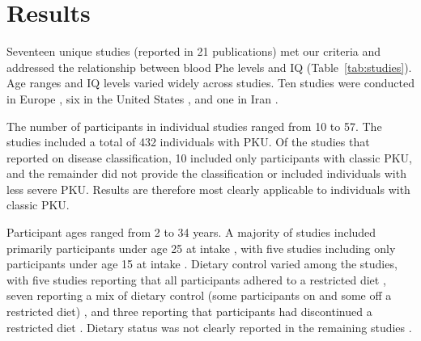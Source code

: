 \documentclass{svjour3}                     %
\begin{document}

\section{Results} %
\label{sec:Results}

Seventeen unique studies (reported in 21 publications) met our criteria and addressed the relationship between blood Phe levels and IQ (Table~\ref{tab:studies}). Age ranges and IQ levels varied widely across studies. Ten studies were conducted in Europe \citep{Cerone:1999vf, Griffiths:2000ti, Jones:1995vw, Leuzzi:1998um, Pfaendner:2005uo, Rupp:2001jg, Schmidt:1994wx, Weglage:2001us, Weglage:2000wf, Weglage:1999tr}, six in the United States \citep{Anastasoaie:2008hv, Ris:1997vv, Seashore:1985wf, Viau:2011he, WASSERSTEIN:2006bv, Welsh:1990uw}, and one in Iran \citep{Azadi:2009ha}.

The number of participants in individual studies ranged from 10 to 57. The studies included a total of 432 individuals with PKU. Of the studies that reported on disease classification, 10 included only participants with classic PKU, and the remainder did not provide the classification or included individuals with less severe PKU. Results are therefore most clearly applicable to individuals with classic PKU.

Participant ages ranged from 2 to 34 years. A majority of studies included primarily participants under age 25 at intake \citep{Anastasoaie:2008hv, Azadi:2009ha, Cerone:1999vf, Griffiths:2000ti, Leuzzi:1998um, Ris:1997vv, Schmidt:1994wx, Seashore:1985wf, Weglage:2000wf, Weglage:1999tr, Welsh:1990uw, Viau:2011he}, with five studies including only participants under age 15 at intake \citep{Anastasoaie:2008hv, Griffiths:2000ti, Seashore:1985wf, Weglage:1999tr, Welsh:1990uw}. Dietary control varied among the studies, with five studies reporting that all participants adhered to a restricted diet \citep{Anastasoaie:2008hv, Azadi:2009ha, Griffiths:2000ti, WASSERSTEIN:2006bv, Welsh:1990uw}, seven reporting a mix of dietary control (some participants on and some off a restricted diet) \citep{Jones:1995vw, Leuzzi:1998um, Pfaendner:2005uo, Ris:1997vv, Rupp:2001jg, Schmidt:1994wx, Viau:2011he}, and three reporting that participants had discontinued a restricted diet \citep{Cerone:1999vf, Seashore:1985wf, Weglage:2001us}. Dietary status was not clearly reported in the remaining studies \citep{Weglage:2000wf, Weglage:1999tr}.
\end{document}
